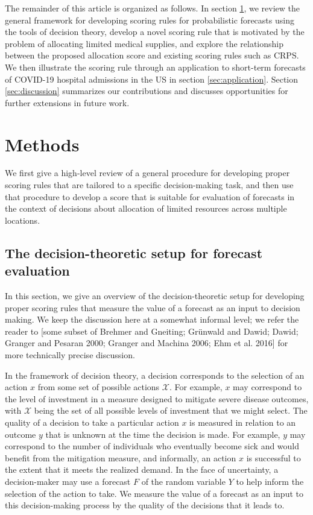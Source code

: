 \documentclass{article}
\begin{document}
The remainder of this article is organized as follows. In section \ref{sec:methods}, we review the general framework for developing scoring rules for probabilistic forecasts using the tools of decision theory, develop a novel scoring rule that is motivated by the problem of allocating limited medical supplies, and explore the relationship between the proposed allocation score and existing scoring rules such as CRPS. We then illustrate the scoring rule through an application to short-term forecasts of COVID-19 hospital admissions in the US in section \ref{sec:application}. Section \ref{sec:discussion} summarizes our contributions and discusses opportunities for further extensions in future work.

\section{Methods}
\label{sec:methods}

We first give a high-level review of a general procedure for developing proper scoring rules that are tailored to a specific decision-making task, and then use that procedure to develop a score that is suitable for evaluation of forecasts in the context of decisions about allocation of limited resources across multiple locations.

\subsection{The decision-theoretic setup for forecast evaluation}
\label{sec:methods.decisiontheory}

In this section, we give an overview of the decision-theoretic setup for developing proper scoring rules that measure the value of a forecast as an input to decision making. We keep the discussion here at a somewhat informal level; we refer the reader to [some subset of Brehmer and Gneiting; Grünwald and Dawid; Dawid; Granger and Pesaran 2000; Granger and Machina 2006; Ehm et al. 2016] for more technically precise discussion.

In the framework of decision theory, a decision corresponds to the selection of an action $x$ from some set of possible actions $\mathcal{X}$. For example, $x$ may correspond to the level of investment in a measure designed to mitigate severe disease outcomes, with $\mathcal{X}$ being the set of all possible levels of investment that we might select. The quality of a decision to take a particular action $x$ is measured in relation to an outcome $y$ that is unknown at the time the decision is made. For example, $y$ may correspond to the number of individuals who eventually become sick and would benefit from the mitigation measure, and informally, an action $x$ is successful to the extent that it meets the realized demand. In the face of uncertainty, a decision-maker may use a forecast $F$ of the random variable $Y$ to help inform the selection of the action to take. We measure the value of a forecast as an input to this decision-making process by the quality of the decisions that it leads to.
\end{document}
